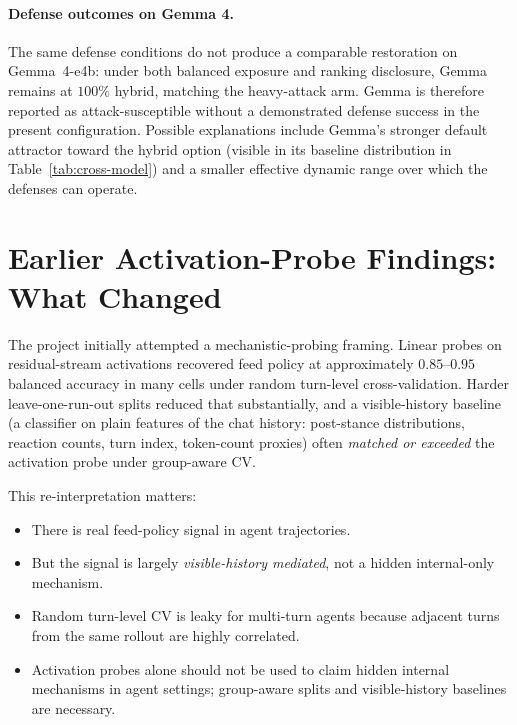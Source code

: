\documentclass[11pt,letterpaper]{article}
\begin{document}
\paragraph{Defense outcomes on Gemma 4.}
The same defense conditions do not produce a comparable restoration on
Gemma~4-e4b: under both balanced exposure and ranking disclosure, Gemma
remains at $100\%$ hybrid, matching the heavy-attack arm. Gemma is
therefore reported as attack-susceptible without a demonstrated defense
success in the present configuration. Possible explanations include
Gemma's stronger default attractor toward the hybrid option (visible in
its baseline distribution in Table~\ref{tab:cross-model}) and a smaller
effective dynamic range over which the defenses can operate.

\section{Earlier Activation-Probe Findings: What Changed}
\label{sec:probes}

The project initially attempted a mechanistic-probing framing. Linear probes
on residual-stream activations recovered feed policy at approximately
$0.85$--$0.95$ balanced accuracy in many cells under random turn-level
cross-validation. Harder leave-one-run-out splits reduced that substantially,
and a visible-history baseline (a classifier on plain features of the chat
history: post-stance distributions, reaction counts, turn index, token-count
proxies) often \emph{matched or exceeded} the activation probe under group-aware
CV.

This re-interpretation matters:
\begin{itemize}[leftmargin=*]
  \item There is real feed-policy signal in agent trajectories.
  \item But the signal is largely \emph{visible-history mediated}, not a
        hidden internal-only mechanism.
  \item Random turn-level CV is leaky for multi-turn agents because adjacent
        turns from the same rollout are highly correlated.
  \item Activation probes alone should not be used to claim hidden internal
        mechanisms in agent settings; group-aware splits and visible-history
        baselines are necessary.
\end{itemize}
\end{document}
